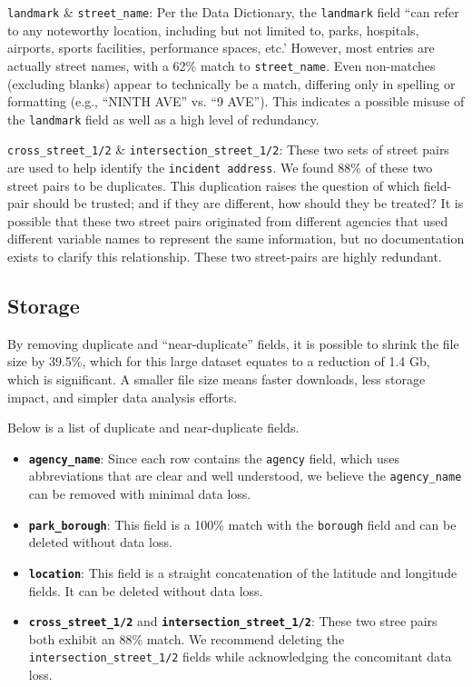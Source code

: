 \documentclass[linenumber]{jdsart}
\begin{document}
\texttt{landmark} \& \texttt{street\_name}: Per the Data Dictionary, the
\texttt{landmark} field ``can refer to any noteworthy location, 
including but not limited to, parks, hospitals, airports, sports 
facilities, performance spaces, etc.'  However, most entries 
are actually street names, with a 62\% match to \texttt{street\_name}. 
Even non-matches (excluding blanks) appear to technically be
a match, differing only in spelling or formatting 
(e.g., ``NINTH AVE'' vs. ``9 AVE''). This indicates a possible 
misuse of the \texttt{landmark} field as well as a high level of redundancy.

\texttt{cross\_street\_1/2} \& \texttt{intersection\_street\_1/2}: These 
two sets of street pairs are used to help identify the 
\texttt{incident address}. We found 88\% of these two street pairs to be 
duplicates. This duplication raises the question of which field-pair 
should be trusted; and if they are different, how should they be treated?
It is possible that these two street pairs originated from different 
agencies that used different variable names to represent the same 
information, but no documentation exists to clarify this 
relationship. These two street-pairs are highly redundant.

\subsection{Storage}
\label{sec:filesize}

By removing duplicate and ``near-duplicate'' fields, it is possible to 
shrink the file size by 39.5\%, which for this large dataset equates to 
a reduction of 1.4 Gb, which is significant. A smaller file size means faster downloads, 
less storage impact, and simpler data analysis efforts.


Below is a list of duplicate and near-duplicate fields. 

\begin{itemize}
    \item \textbf{\texttt{agency\_name}}: Since each row contains the \texttt{agency} 
    field, which uses abbreviations that are clear and well understood, we believe the
    \texttt{agency\_name} can be removed with minimal data loss.
    
    \item \textbf{\texttt{park\_borough}}: This field is a 100\% match with 
    the \texttt{borough} field and can be deleted without data loss.
    
    \item \textbf{\texttt{location}}: This field is a straight concatenation of 
    the latitude and longitude fields. It can be deleted without data loss.
     
    \item \textbf{\texttt{cross\_street\_1/2}} and \textbf{\texttt{intersection\_street\_1/2}}: 
    These two stree pairs both exhibit an 88\% match. We recommend deleting the 
    \texttt{intersection\_street\_1/2} fields while acknowledging 
    the concomitant data loss.
    
\end{itemize}
\end{document}

